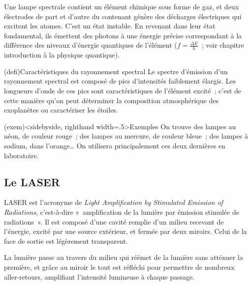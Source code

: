 \documentclass[../../main/main.tex]{subfiles}
\begin{document}
Une lampe spectrale contient un élément chimique sous forme de gaz, et deux
électrodes de part et d'autre du contenant génère des décharges électriques qui
excitent les atomes. C'est un état instable. En revenant dans leur état
fondamental, ils émettent des photons à une énergie précise correspondant à la
différence des niveaux d'énergie quantiques de l'élément ($f = \frac{\Delta
		E}{h}$~; voir chapitre introduction à la physique quantique).

\begin{tcb}(defi){Caractéristiques du rayonnement spectral}
	Le spectre d'émission d'un rayonnement spectral est composé de pics
	d'intensités faiblement élargis. Les longueurs d'onde de ces pics sont
	caractéristiques de l'élément excité~; c'est de cette manière qu'on peut
	déterminer la composition atmosphérique des exoplanètes ou caractériser les
	étoiles.
\end{tcb}
\begin{tcb}(exem)<sidebyside, righthand width=.5\linewidth>{Exemples}
	On trouve des lampes au néon, de couleur rouge~; des lampes au mercure, de
	couleur bleue~; des lampes à sodium, dans l'orange… On utilisera
	principalement ces deux dernières en laboratoire.
	\tcblower
	\begin{center}
		\pgfspectra[element=Hg,
		axis, axis color=white, axis font color=black,
		axis ticks=4, axis unit precision=2,
		axis label text={Longueur d'onde [$\si{nm}$]},
		back=white,
		label, label position=north west,
		label before text=Spectre d'émission de~,
		label after text=\ :]
		\label{fig:lamp_spec}
	\end{center}
\end{tcb}

\subsection{Le LASER}
LASER est l'acronyme de \textit{Light Amplification by Stimulated Emission of
	Radiations}, c'est-à-dire «~amplification de la lumière par émission stimulée de
radiations~». Il est composé d'une cavité remplie d'un milieu recevant de
l'énergie, excité par une source extérieur, et fermée par deux miroirs. Celui de
la face de sortie est légèrement transparent.

La lumière passe au travers du milieu qui réémet de la lumière sans atténuer la
première, et grâce au miroir le tout est réfléchi pour permettre de nombreux
aller-retours, amplifiant l'intensité lumineuse à chaque passage.
\end{document}
